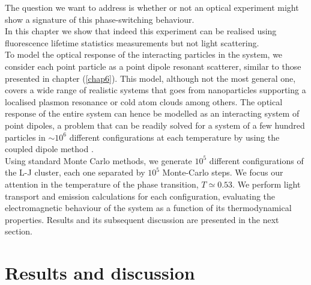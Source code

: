 The question we want to address is whether or not an optical experiment might show a signature of this phase-switching behaviour.\\
In this chapter we show that indeed this experiment can be realised using fluorescence lifetime statistics measurements but not light scattering.\\
To model the optical response of the interacting particles in the system, we consider each point particle as a point dipole resonant scatterer, similar to those presented in chapter (\ref{chap6}). This model, although not the most general one, covers a wide range of realistic systems that goes from nanoparticles supporting a localised plasmon resonance or cold atom clouds among others. The optical response of the entire system can hence be modelled as an interacting system of point dipoles, a problem that can be readily solved for a system of a few hundred particles in $\sim10^{6}$ different configurations at each temperature by using the coupled dipole method \cite{draine1994discrete}.\\
Using standard Monte Carlo methods, we generate $10^5$ different configurations
of the L-J cluster, each one separated by $10^5$ Monte-Carlo steps. We focus our attention in the temperature of the phase transition, $T\simeq0.53$. We perform light transport and emission calculations for each configuration, evaluating the electromagnetic behaviour of the system as a function of its thermodynamical properties. Results and its subsequent discussion are presented in the next section.

\section{Results and discussion \label{sec:chap8_discussions}}

